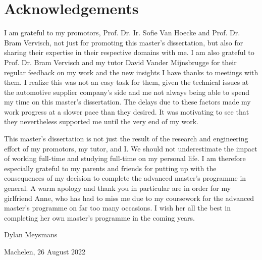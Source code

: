 \chapter{Acknowledgements}

I am grateful to my promotors, Prof. Dr. Ir. Sofie Van Hoecke and Prof. Dr. Bram Vervisch, not just for promoting this master's dissertation, but also for sharing their expertise in their respective domains with me.
I am also grateful to Prof. Dr. Bram Vervisch and my tutor David Vander Mijnsbrugge for their regular feedback on my work and the new insights I have thanks to meetings with them.
I realize this was not an easy task for them, given the technical issues at the automotive supplier company's side and me not always being able to spend my time on this master's dissertation.
The delays due to these factors made my work progress at a slower pace than they desired.
It was motivating to see that they nevertheless supported me until the very end of my work.

This master's dissertation is not just the result of the research and engineering effort of my promotors, my tutor, and I.
We should not underestimate the impact of working full-time and studying full-time on my personal life.
I am therefore especially grateful to my parents and friends for putting up with the consequences of my decision to complete the advanced master's programme in general.
A warm apology and thank you in particular are in order for my girlfriend Anne, who has had to miss me due to my coursework for the advanced master's programme on far too many occasions.
I wish her all the best in completing her own master's programme in the coming years.

Dylan Meysmans

Machelen, 26 August 2022
